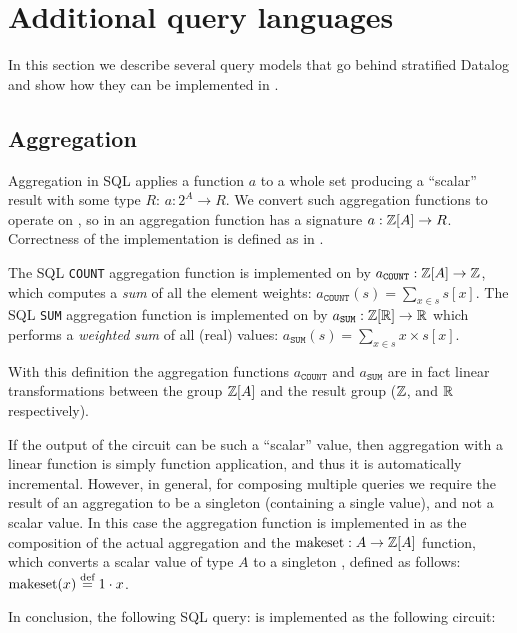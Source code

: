 \section{Additional query languages}\label{sec:extensions}

In this section we describe several query models that go behind stratified Datalog
and show how they can be implemented in \dbsp.

\subsection{Aggregation}\label{sec:aggregation}

Aggregation in SQL applies a function $a$ to a whole set producing a ``scalar''
result with some type $R$: $a: 2^A \to R$.  We convert such aggregation
functions to operate on \zrs, so in \dbsp an aggregation function has
a signature $a: \mathbb{Z}[A] \to R$.  Correctness of the implementation is 
defined as in .

The SQL \texttt{COUNT} aggregation function is implemented on \zrs by $a_\texttt{COUNT} : \mathbb{Z}[A] \to \mathbb{Z}$, which
computes a \emph{sum} of all the element weights: $a_\texttt{COUNT}(s) = \sum_{x \in s} s[x]$.
The SQL \texttt{SUM} aggregation function is implemented on \zrs by $a_\texttt{SUM}: \mathbb{Z}[\mathbb{R}] \to \mathbb{R}$ which
performs a \emph{weighted sum} of all (real) values: $a_\texttt{SUM}(s) = \sum_{x \in s} x \times s[x]$.

With this definition the aggregation functions $a_\texttt{COUNT}$ and $a_\texttt{SUM}$ are in
fact linear transformations between the group $\mathbb{Z}[A]$ and the result group ($\mathbb{Z}$, and $\mathbb{R}$ respectively).

If the output of the \dbsp circuit can be such a ``scalar'' value, then aggregation
with a linear function is simply function application, and thus it is automatically incremental.  However, in general, for composing multiple queries
we require the result of an aggregation to be a singleton \zr (containing a single value),
and not a scalar value.  In this case the aggregation function is implemented in
\dbsp as the composition of the actual aggregation and the 
$\mbox{makeset}: A \to \mathbb{Z}[A]$ function, 
which converts a scalar value of type $A$ to a singleton \zr, defined as follows:
$\mbox{makeset}(x) \stackrel{\textrm{\scriptsize def}}{=} 1 \cdot x$.

In conclusion, the following SQL query: 
is implemented as the following circuit:


